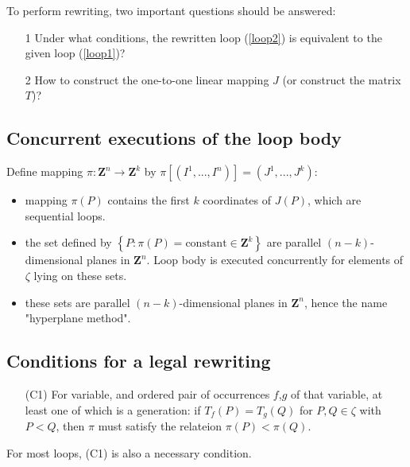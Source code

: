 To perform rewriting, two important questions should be answered:
\begin{question}
  \begin{itemize}
  \item [1]
  Under what conditions, the rewritten loop (\ref{loop2}) is equivalent to the given
  loop (\ref{loop1})?
  \item [2]
  How to construct the one-to-one linear mapping $J$ (or construct the matrix $T$)?
  \end{itemize}
\end{question}

\subsection{Concurrent executions of the loop body}

Define mapping $\pi :\mathbf{Z}^n\rightarrow\mathbf{Z}^k$ by $\pi[(I^1,...,I^n)]=(J^1,...,J^k)$:

\begin{itemize}
\item mapping $\pi(P)$ contains the first $k$ coordinates of $J(P)$, which are sequential loops.
\item the set defined by $\left\{ P:\pi(P)=\text{constant}\in \mathbf{Z}^k \right\}$
are parallel $(n-k)$-dimensional planes in $\mathbf{Z}^n$.
Loop body is executed concurrently for elements of $\zeta$ lying on these sets.
\item these sets are parallel $(n-k)$-dimensional planes in
$\mathbf{Z}^n$, hence the name "hyperplane method".
\end{itemize}

\subsection{Conditions for a legal rewriting}

\begin{info}
\begin{itemize}
\item [(C1)]
  For {} variable, and {}
  ordered pair of occurrences $f$,$g$ of that variable,
  at least one of which is a generation: if $T_f(P)=T_g(Q)$ for $P, Q \in \zeta$
  with $P<Q$, then $\pi$ must satisfy the relateion $\pi(P)<\pi(Q)$.
\end{itemize}
\end{info}
For most loops, (C1) is also a necessary condition.

